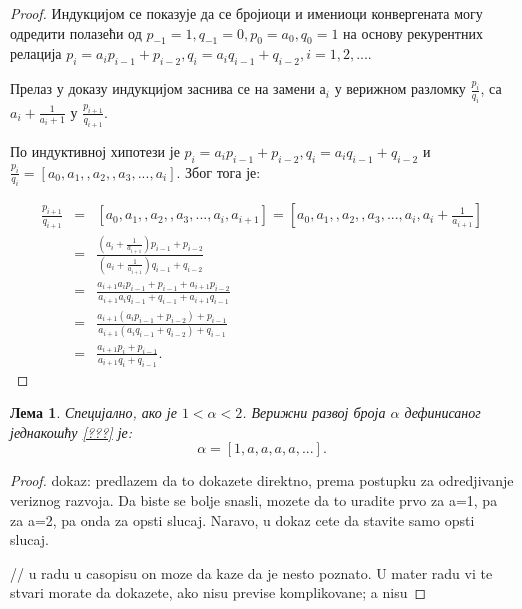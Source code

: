 \documentclass[a4paper]{article}
\newtheorem{lemma}{Лема}
\begin{document}
\begin{proof}
	
	Индукцијом се показује да се бројиоци и имениоци конвергената могу одредити полазећи од $ p_{-1} = 1, q_{-1} = 0, p_{0} = a_{0}, q_{0} = 1 $ на основу рекурентних релација $ p_{i} = a_{i}p_{i-1} + p_{i-2},  q_{i} = a_{i}q_{i-1} + q_{i-2}, i = 1, 2, ... $.
	
	Прелаз у доказу индукцијом заснива се на замени $ а_{i} $ у верижном разломку $ \frac{p_{i}}{q_{i}} $, са $ a_{i} + \frac{1}{a_{i} + 1} $
	у $ \frac{p_{i+1}}{q_{i+1}} $.
	
	По индуктивној хипотези је $ p_{i} = a_{i}p_{i-1} + p_{i-2}, q_{i} = a_{i}q_{i-1} + q_{i-2} $ и $ \frac{p_{i}}{q_{i}} = [a_{0}, a_{1}, , a_{2}, , a_{3}, ..., a_{i}] $. Због тога је:
	
	\begin{eqnarray*}
		\frac{p_{i+1}}{q_{i+1}} &=& [a_{0}, a_{1}, , a_{2}, , a_{3}, ..., a_{i}, a_{i+1}] = [a_{0}, a_{1}, , a_{2}, , a_{3}, ..., a_{i}, a_{i} + \frac{1}{a_{i+1}}] \\
		&=& \frac{(a_{i} + \frac{1}{a_{i+1}})p_{i-1} + p_{i-2}}{(a_{i} + \frac{1}{a_{i+1}})q_{i-1} + q_{i-2}} \\
		&=& \frac{a_{i+1}a_{i}p_{i-1} + p_{i-1} + a_{i+1}p_{i-2}}{a_{i+1}a_{i}q_{i-1} + q_{i-1} + a_{i+1}q_{i-1}}\\
		&=& \frac{a_{i+1}(a_{i}p_{i-1} + p_{i-2}) + p_{i-1}}{a_{i+1}(a_{i}q_{i-1} + q_{i-2}) + q_{i-1}}\\
		&=& \frac{a_{i+1}p_{i} + p_{i-1}}{a_{i+1}q_{i} + q_{i-1}}. 
	\end{eqnarray*}
\end{proof}

\begin{lemma}
	Специјално, ако је $ 1 < \alpha < 2 $. Верижни развој броја $ \alpha $ дефинисаног једнакошћу \ref{???} је:
		\begin{displaymath}
			\alpha = [1 ,a, a, a, a, ...].
		\end{displaymath}  
\end{lemma}

\begin{proof}
	dokaz: predlazem da to dokazete direktno, prema postupku za odredjivanje veriznog razvoja. Da biste se bolje snasli, mozete da to uradite prvo za a=1, pa za a=2, pa onda za opsti slucaj. Naravo, u dokaz cete da stavite samo opsti slucaj.
	
	// u radu u casopisu on moze da kaze da je nesto poznato. U mater radu vi te stvari morate da dokazete, ako nisu previse komplikovane; a nisu
\end{proof}
\end{document}
